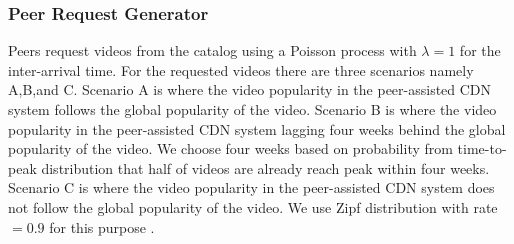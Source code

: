 \documentclass[10pt,final,journal,a4paper]{IEEEtran}
\begin{document}
\subsubsection{Peer Request Generator}\label{peerrequest}
Peers request videos from the catalog using a Poisson process with $\lambda=1$ \cite{Zink:2009:CYN:1502814.1502987} for the inter-arrival time.
For the requested videos there are three scenarios namely A,B,and C.
Scenario A is where the video popularity in the peer-assisted CDN system follows the global popularity of the video.
Scenario B is where the video popularity in the peer-assisted CDN system lagging four weeks behind the global popularity of the video. 
We choose four weeks based on probability from time-to-peak distribution that half of videos are already reach peak within four weeks.
Scenario C is where the video popularity in the peer-assisted CDN system does not follow the global popularity of the video. 
We use Zipf distribution with rate$=0.9$ for this purpose \cite{6654887}.




\end{document}
